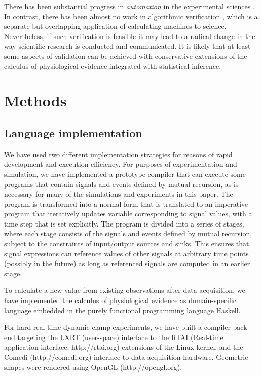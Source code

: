 There has been substantial progress in \emph{automation} in the
experimental sciences \citep{King2004}. In contrast, there has been
almost no work in algorithmic verification \citep{Kropf1999,
  Sadat2008}, which is a separate but overlapping application of
calculating machines to science. Nevertheless, if such verification is
feasible it may lead to a radical change in the way scientific
research is conducted and communicated. It is likely that at least
some aspects of validation can be achieved with conservative
extensions of the calculus of physiological evidence integrated with
statistical inference.

\section*{Methods}

\subsection*{Language implementation} 

We have used two different implementation strategies for reasons of
rapid development and execution efficiency. For purposes of
experimentation and simulation, we have implemented a prototype
compiler that can execute some programs that contain signals and
events defined by mutual recursion, as is necessary for many of the
simulations and experiments in this paper. The program is transformed
into a normal form that is translated to an imperative
program that iteratively updates variable corresponding to signal
values, with a time step that is set explicitly. The program is divided
into a series of stages, where each stage consists of the signals and
events defined by mutual recursion, subject to the constraints of
input/output sources and sinks. This ensures that signal expressions
can reference values of other signals at arbitrary time points
(possibly in the future) as long as referenced signals are computed in
an earlier stage.

To calculate a new value from existing observations after data
acquisition, we have implemented the calculus of physiological
evidence as domain-specific language embedded in the purely functional
programming language Haskell. 

For hard real-time dynamic-clamp experiments, we have built a compiler
back-end targeting the LXRT (user-space) interface to the RTAI (Real-time
application interface; http://rtai.org) extensions of the Linux
kernel, and the Comedi (http://comedi.org) interface to data
acquisition hardware. Geometric shapes were rendered using OpenGL
(http://opengl.org).

